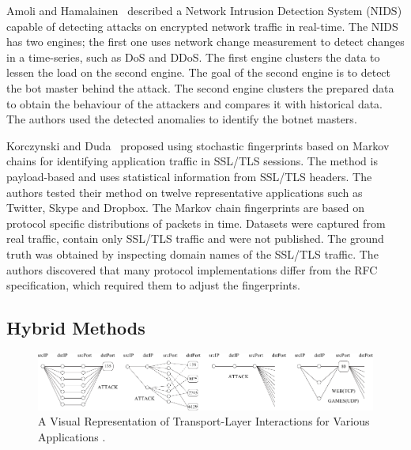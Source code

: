 Amoli and Hamalainen~\cite{Amoli-2013-real} described a Network Intrusion Detection System (NIDS) capable of detecting attacks on encrypted network traffic in real-time. The NIDS has two engines; the first one uses network change measurement to detect changes in a time-series, such as DoS and DDoS. The first engine clusters the data to lessen the load on the second engine. The goal of the second engine is to detect the bot master behind the attack. The second engine clusters the prepared data to obtain the behaviour of the attackers and compares it with historical data. The authors used the detected anomalies to identify the botnet masters.

Korczynski and Duda~\cite{Korczynski-2014-Markov} proposed using stochastic fingerprints based on Markov chains for identifying application traffic in SSL/TLS sessions. The method is payload-based and uses statistical information from SSL/TLS headers. The authors tested their method on twelve representative applications such as Twitter, Skype and Dropbox. The Markov chain fingerprints are based on protocol specific distributions of packets in time. Datasets were captured from real traffic, contain only SSL/TLS traffic and were not published. The ground truth was obtained by inspecting domain names of the SSL/TLS traffic. The authors discovered that many protocol implementations differ from the RFC specification, which required them to adjust the fingerprints.

\subsection{Hybrid Methods}\label{subsec:hybrid}

\begin{figure}[!t]
    \begin{center}
        \includegraphics[width=0.9\linewidth]{figures/paper-encrypted/graphlets}
        \caption{A Visual Representation of Transport-Layer Interactions for Various Applications \cite{Karagiannis-2005-BLINC}.}
        \label{fig:graphlets}
    \end{center}
\end{figure}

